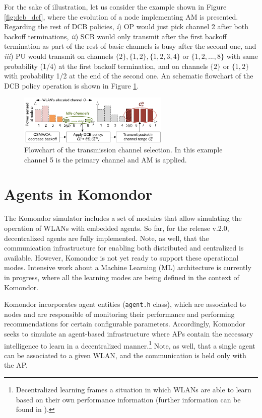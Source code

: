 \documentclass[a4paper]{article}
\begin{document}
For the sake of illustration, let us consider the example shown in Figure \ref{fig:dcb_dcf}, where the evolution of a node implementing AM is presented. Regarding the rest of DCB policies, \textit{i}) OP would just pick channel 2 after both backoff terminations, \textit{ii}) SCB would only transmit after the first backoff termination as part of the rest of basic channels is busy after the second one, and \textit{iii}) PU would transmit on channels $\{2\}, \{1,2\}, \{1,2,3,4\}$ or $\{1,2,...,8\}$ with same probability (1/4) at the first backoff termination, and on channels $\{2\}$ or $\{1,2\}$ with probability 1/2 at the end of the second one. An schematic flowchart of the DCB policy operation is shown in Figure \ref{fig:cb_policy_flowchart}.

\begin{figure}[h]
	\centering
	\includegraphics[width=0.64\textwidth]{images/cb_policy_flowchart.png}
	\caption{Flowchart of the transmission channel selection. In this example channel 5 is the primary channel and AM is applied.}    
	\label{fig:cb_policy_flowchart}
\end{figure}

\section{Agents in Komondor}
\label{section:agents}
The Komondor simulator includes a set of modules that allow simulating the operation of WLANs with embedded agents. So far, for the release v.2.0, decentralized agents are fully implemented. Note, as well, that the communication infrastructure for enabling both distributed and centralized is available. However, Komondor is not yet ready to support these operational modes. Intensive work about a Machine Learning (ML) architecture is currently in progress, where all the learning modes are being defined in the context of Komondor. 

Komondor incorporates agent entities (\texttt{agent.h} class), which are associated to nodes and are responsible of monitoring their performance and performing recommendations for certain configurable parameters. Accordingly, Komondor seeks to simulate an agent-based infrastructure where APs contain the necessary intelligence to learn in a decentralized manner.\footnote{Decentralized learning frames a situation in which WLANs are able to learn based on their own performance information (further information can be found in \cite{wilhelmi2017implications, wilhelmi2017collaborative, wilhelmi2018potential}).} Note, as well, that a single agent can be associated to a given WLAN, and the communication is held only with the AP.
\end{document}
